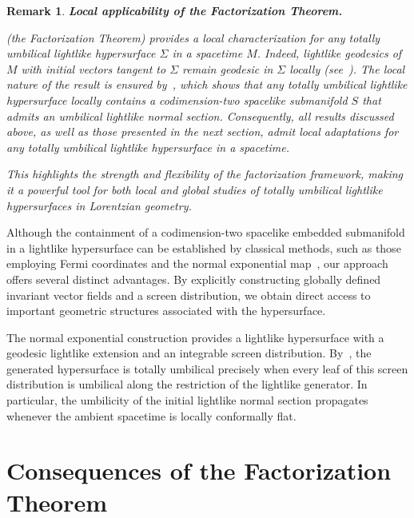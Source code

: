 \documentclass[11pt]{article}
\numberwithin{equation}{section}
\newtheorem{remark}[theorem]{Remark}
\begin{document}
\begin{remark}\label{remark:local_version}
		\textbf{Local applicability of the Factorization Theorem.} \normalfont
		
		 (the Factorization Theorem) provides a local characterization for any totally umbilical lightlike hypersurface $\Sigma$ in a spacetime $M$. Indeed, lightlike geodesics of $M$ with initial vectors tangent to $\Sigma$ remain geodesic in $\Sigma$ locally (see~). The local nature of the result is ensured by~, which shows that any totally umbilical lightlike hypersurface locally contains a codimension-two spacelike submanifold $S$ that admits an umbilical lightlike normal section. Consequently, all results discussed above, as well as those presented in the next section, admit local adaptations for any totally umbilical lightlike hypersurface in a spacetime.
		
		This highlights the strength and flexibility of the factorization framework, making it a powerful tool for both local and global studies of totally umbilical lightlike hypersurfaces in Lorentzian geometry.
	\end{remark}
	
	\medskip
	
Although the containment of a codimension-two spacelike embedded submanifold in a lightlike hypersurface can be established by classical methods, such as those employing Fermi coordinates and the normal exponential map~\cite[p.~60]{penrose1972}, our approach offers several distinct advantages. By explicitly constructing globally defined invariant vector fields and a screen distribution, we obtain direct access to important geometric structures associated with the hypersurface.

The normal exponential construction provides a lightlike hypersurface with a geodesic lightlike extension and an integrable screen distribution. By~, the generated hypersurface is totally umbilical precisely when every leaf of this screen distribution is umbilical along the restriction of the lightlike generator. In particular, the umbilicity of the initial lightlike normal section propagates whenever the ambient spacetime is locally conformally flat.
	
	
	
	\section{Consequences of the Factorization Theorem}\label{sec:conse_Umbil_Fac_Th}
	
\end{document}

